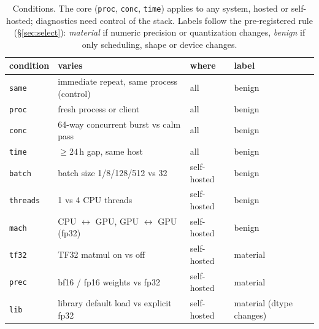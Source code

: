 \documentclass{article}
\newcommand{\cond}[1]{\texttt{#1}}
\begin{document}
\begin{table}[t]
\centering\footnotesize
\caption{Conditions. The core (\cond{proc}, \cond{conc}, \cond{time}) applies to any system, hosted or self-hosted; diagnostics need control of the stack. Labels follow the pre-registered rule (\S\ref{sec:select}): \emph{material} if numeric precision or quantization changes, \emph{benign} if only scheduling, shape or device changes.}
\label{tab:conditions}
\begin{tabular}{llll}
\toprule
condition & varies & where & label \\
\midrule
\cond{same} & immediate repeat, same process (control) & all & benign \\
\cond{proc} & fresh process or client & all & benign \\
\cond{conc} & 64-way concurrent burst vs calm pass & all & benign \\
\cond{time} & $\ge 24$\,h gap, same host & all & benign \\
\midrule
\cond{batch} & batch size 1/8/128/512 vs 32 & self-hosted & benign \\
\cond{threads} & 1 vs 4 CPU threads & self-hosted & benign \\
\cond{mach} & CPU $\leftrightarrow$ GPU, GPU $\leftrightarrow$ GPU (fp32) & self-hosted & benign \\
\cond{tf32} & TF32 matmul on vs off & self-hosted & material \\
\cond{prec} & bf16 / fp16 weights vs fp32 & self-hosted & material \\
\cond{lib} & library default load vs explicit fp32 & self-hosted & material (dtype changes) \\
\bottomrule
\end{tabular}
\end{table}
\end{document}
